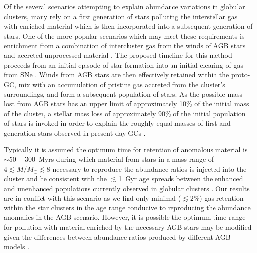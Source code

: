 \documentclass[fleqn,usenatbib]{mnras}
\begin{document}
 Of the several scenarios attempting to explain abundance variations in globular clusters, many rely on a first generation of stars polluting the interstellar gas with enriched material which is then incorporated into a subsequent generation of stars.
 One of the more popular scenarios which may meet these requirements is enrichment from a combination of intercluster gas from the winds of AGB stars and accreted unprocessed material \citep{prantzos2007,ventura2008a,ventura2008b,pflamm2009,dercole2010,conroy2011a}.  The proposed timeline  for this method proceeds from an initial episode of star formation into an initial clearing of gas from SNe \citep{dantona2004,dercole2008,conroy2011a}.  Winds from AGB stars are then effectively retained within the proto-GC, mix with an accumulation of pristine gas accreted from the cluster's surroundings, and form a subsequent population of stars.  As the possible mass lost from AGB stars has an upper limit of approximately 10\% of the initial mass of the cluster, a stellar mass loss of approximately 90\% of the initial population of stars is invoked in order to explain the roughly equal masses of first and generation stars observed in present day GCs \citep{dercole2008,conroy2011a,conroy2011b,conroy2012}.

 Typically it is assumed the optimum time for retention of anomalous material is $\sim 50 - 300$~Myrs during which material from stars in a mass range of $4 \lesssim M/M_\odot \lesssim 8$ necessary to reproduce the abundance ratios is injected into the cluster \citep{ventura2001,karakas2007,ventura2008a,ventura2008b} and be consistent with the $\lesssim$1~Gyr age spreads between the enhanced and unenhanced populations currently observed in globular clusters \citep{larsen2011,cabrera2014,cabrera2016,mart2018}.   
 Our results are in conflict with this scenario as we find only minimal ($\lesssim 2$\%) gas retention within the star clusters in the age range conducive to reproducing the abundance anomalies in the AGB scenario.  
 However, it is possible the optimum time range for pollution with material enriched by the necessary AGB stars may be modified given the differences between abundance ratios produced by different AGB models \citep{fenner2004,karakas2006,choi2008,bekki2007,ventura2008a,ventura2008b,doherty2014a,doherty2014b}.
\end{document}

